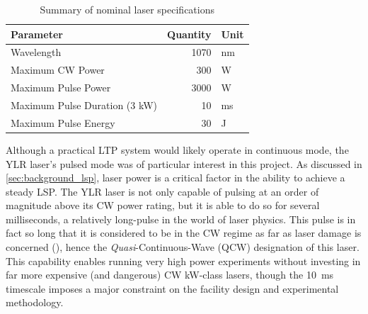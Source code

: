             \begin{table}[h]
                \centering
                \caption{Summary of nominal laser specifications}
                \label{tab:laser_spec}
                \begin{tabular}{@{}lrl@{}}
                    \toprule
                    \textbf{Parameter}            & \textbf{Quantity} & \textbf{Unit} \\ \midrule
                    Wavelength                    & 1070              & nm            \\
                    Maximum CW Power              & 300               & W             \\
                    Maximum Pulse Power           & 3000              & W             \\
                    Maximum Pulse Duration (3 kW) & 10                & ms            \\
                    Maximum Pulse Energy          & 30              & J             \\ \bottomrule
                    \end{tabular}
            \end{table}

            Although a practical LTP system would likely operate in continuous mode, the YLR laser's pulsed mode was of particular interest in this project. As discussed in \autoref{sec:background_lsp}, laser power is a critical factor in the ability to achieve a steady LSP. The YLR laser is not only capable of pulsing at an order of magnitude above its CW power rating, but it is able to do so for several milliseconds, a relatively long-pulse in the world of laser physics. This pulse is in fact so long that it is considered to be in the CW regime as far as laser damage is concerned (\textcite{thorlabsNBK7PlanoConvexLenses}), hence the \emph{Quasi}-Continuous-Wave (QCW) designation of this laser. This capability enables running very high power experiments without investing in far more expensive (and dangerous) CW kW-class lasers, though the 10~ms timescale imposes a major constraint on the facility design and experimental methodology.
        

